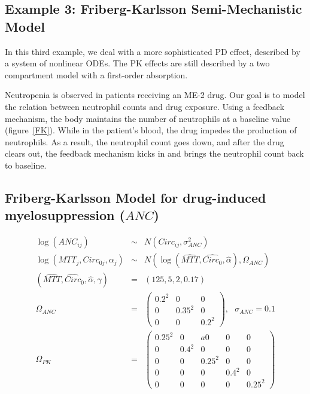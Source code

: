 \documentclass[11pt]{amsart}
\begin{document}
\subsection*{Example 3: Friberg-Karlsson Semi-Mechanistic Model \cite{2364}}

In this third example, we deal with a more sophisticated PD effect, described by a system of nonlinear ODEs. The PK effects are still described by a two compartment model with a first-order absorption. 

Neutropenia is observed in patients receiving an ME-2 drug. Our goal is to model the relation between neutrophil counts and drug exposure. Using a feedback mechanism, the body maintains the number of neutrophils at a baseline value (figure~\ref{FK}). While in the patient's blood, the drug impedes the production of neutrophils. As a result, the neutrophil count goes down, and after  the drug clears out, the feedback mechanism kicks in and brings the neutrophil count back to baseline.

\subsection*{Friberg-Karlsson Model for drug-induced myelosuppression ($ANC$)}

\begin{eqnarray*}
\log(ANC_{ij}) &\sim& N(Circ_{ij}, \sigma^2_{ANC}) \\
\log\left(MTT_j, Circ_{0j}, \alpha_j\right) &\sim& N\left(\log\left(\widehat{MTT}, \widehat{Circ_0}, \widehat{\alpha}\right), \Omega_{ANC}\right) \\
\left(\widehat{MTT}, \widehat{Circ}_0,\widehat{\alpha}, \gamma \right) &=& \left(125, 5, 2, 0.17\right) \\
\Omega_{ANC} &=& \left(\begin{array}{ccc} 0.2^2 & 0 & 0 \\ 0 & 0.35^2 & 0 \\ 0 & 0 & 0.2^2 \end{array}\right), \ \ \ \sigma_{ANC} = 0.1 \\
\Omega_{PK} &=& \left(\begin{array}{ccccc} 0.25^2 & 0 &a 0 & 0 & 0 \\ 0 & 0.4^2 & 0 & 0 & 0 \\
0 & 0 & 0.25^2 & 0 & 0 \\ 0 & 0 & 0 & 0.4^2 & 0 \\ 0 & 0 & 0 & 0 & 0.25^2  \end{array}\right)
\end{eqnarray*}
\end{document}
